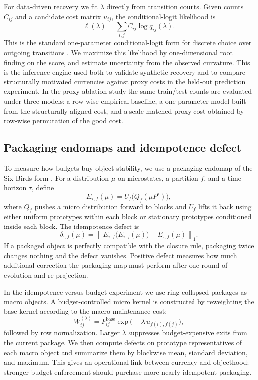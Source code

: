 \documentclass[11pt,a4paper]{article}
\begin{document}
For data-driven recovery we fit \(\lambda\) directly from transition counts. Given counts \(C_{ij}\) and a candidate cost matrix \(u_{ij}\), the conditional-logit likelihood is
\[
\ell(\lambda)=\sum_{i,j} C_{ij}\log q_{ij}(\lambda).
\]
This is the standard one-parameter conditional-logit form for discrete choice over outgoing transitions \cite{mcfadden1974conditional}.
We maximize this likelihood by one-dimensional root finding on the score, and estimate uncertainty from the observed curvature. This is the inference engine used both to validate synthetic recovery and to compare structurally motivated currencies against proxy costs in the held-out prediction experiment. In the proxy-ablation study the same train/test counts are evaluated under three models: a row-wise empirical baseline, a one-parameter model built from the structurally aligned cost, and a scale-matched proxy cost obtained by row-wise permutation of the good cost.

\subsection{Packaging endomaps and idempotence defect}

To measure how budgets buy object stability, we use a packaging endomap of the Six Birds form \cite{tsiokos2026sixbirds}. For a distribution \(\mu\) on microstates, a partition \(f\), and a time horizon \(\tau\), define
\[
E_{\tau,f}(\mu)=U_f\big(Q_f(\mu P^\tau)\big),
\]
where \(Q_f\) pushes a micro distribution forward to blocks and \(U_f\) lifts it back using either uniform prototypes within each block or stationary prototypes conditioned inside each block. The idempotence defect is
\[
\delta_{\tau,f}(\mu)=\left\|E_{\tau,f}\!\big(E_{\tau,f}(\mu)\big)-E_{\tau,f}(\mu)\right\|_1.
\]
If a packaged object is perfectly compatible with the closure rule, packaging twice changes nothing and the defect vanishes. Positive defect measures how much additional correction the packaging map must perform after one round of evolution and re-projection.

In the idempotence-versus-budget experiment we use ring-collapsed packages as macro objects. A budget-controlled micro kernel is constructed by reweighting the base kernel according to the macro maintenance cost:
\[
W^{(\lambda)}_{ij}=P^{\mathrm{base}}_{ij}\exp\!\big(-\lambda\,u_{f(i),f(j)}\big),
\]
followed by row normalization. Larger \(\lambda\) suppresses budget-expensive exits from the current package. We then compute defects on prototype representatives of each macro object and summarize them by blockwise mean, standard deviation, and maximum. This gives an operational link between currency and objecthood: stronger budget enforcement should purchase more nearly idempotent packaging.
\end{document}
